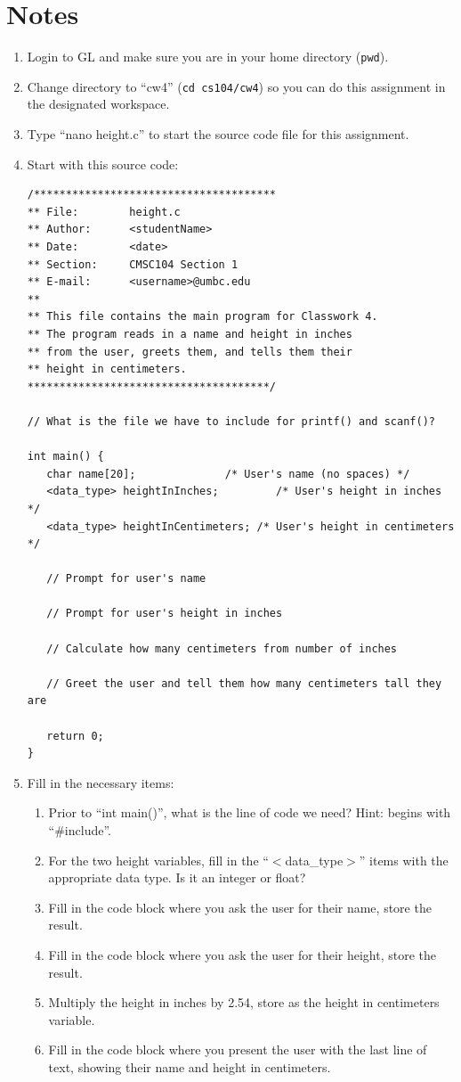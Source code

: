 \documentclass[letter,11pt]{article}
\begin{document}
\section*{Notes}
\begin{enumerate}
    \item Login to GL and make sure you are in your home directory (\texttt{pwd}).
    \item Change directory to ``cw4'' (\texttt{cd cs104/cw4}) so you can do this assignment in the designated workspace.
    \item Type ``nano height.c'' to start the source code file for this assignment.
    \item Start with this source code: 
    \begin{verbatim}
/**************************************
** File:        height.c
** Author:      <studentName>
** Date:        <date>
** Section:     CMSC104 Section 1
** E-mail:      <username>@umbc.edu
**
** This file contains the main program for Classwork 4.
** The program reads in a name and height in inches
** from the user, greets them, and tells them their
** height in centimeters.
**************************************/

// What is the file we have to include for printf() and scanf()?

int main() {
   char name[20];              /* User's name (no spaces) */
   <data_type> heightInInches;         /* User's height in inches */
   <data_type> heightInCentimeters; /* User's height in centimeters */

   // Prompt for user's name

   // Prompt for user's height in inches

   // Calculate how many centimeters from number of inches

   // Greet the user and tell them how many centimeters tall they are

   return 0;
}
    \end{verbatim}
    \item Fill in the necessary items:
    \begin{enumerate}
        \item Prior to ``int main()'', what is the line of code we need? Hint: begins with ``\#include''.
        \item For the two height variables, fill in the ``$<$data\_type$>$'' items with the appropriate data type. Is it an integer or float?
        \item Fill in the code block where you ask the user for their name, store the result.
        \item Fill in the code block where you ask the user for their height, store the result.
        \item Multiply the height in inches by 2.54, store as the height in centimeters variable.
        \item Fill in the code block where you present the user with the last line of text, showing their name and height in centimeters.
    \end{enumerate}
\end{enumerate}
\end{document}
